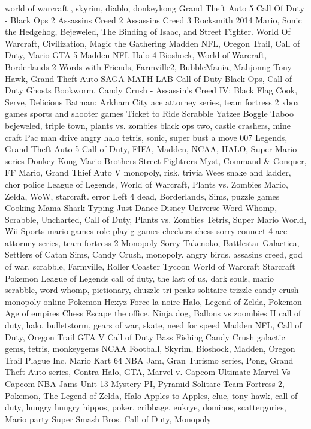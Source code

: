 world of warcraft ,  skyrim,  diablo,  donkeykong
Grand Theft Auto 5  Call Of Duty - Black Ops 2  Assassins Creed 2  Assassins Creed 3  Rocksmith 2014
Mario, Sonic the Hedgehog, Bejeweled, The Binding of Isaac, and Street Fighter.
World Of Warcraft, Civilization, Magic the Gathering
Madden NFL, Oregon Trail, Call of Duty, Mario
GTA 5  Madden NFL  Halo 4  
Bioshock, World of Warcraft, Borderlands 2
Words with Friends, Farmville2, BubbleMania, Mahjonng
Tony Hawk, Grand Theft Auto
SAGA  MATH LAB
Call of Duty Black Ops, Call of Duty Ghosts 
Bookworm, Candy Crush
-
Assassin's Creed IV: Black Flag  Cook, Serve, Delicious  Batman: Arkham City
ace attorney series, team fortress 2
xbox games sports and shooter games
Ticket to Ride  Scrabble  Yatzee  Boggle  Taboo
bejeweled, triple town, plants vs. zombies
black ops two, castle crashers, mine craft
Pac man drive angry halo 
tetris, sonic, super bust a move
007 Legends, Grand Theft Auto 5
Call of Duty, FIFA, Madden, NCAA, HALO, Super Mario series
Donkey Kong   Mario Brothers  Street Fightrers
Myst, Command & Conquer, FF
Mario, Grand Thief Auto V
monopoly, risk, trivia
Wees
snake and ladder, chor police
League of Legends, World of Warcraft, Plants vs. Zombies
Mario, Zelda, WoW, starcraft. 
error
Left 4 dead, Borderlands, Sims, puzzle games
Cooking Mama  Shark Typing  Just Dance  Disney Universe
Word Whomp, Scrabble, Uncharted, Call of Duty, Plants vs. Zombies
Tetris, Super Mario World, Wii Sports
mario games  role playig games  checkers  chess  sorry  connect 4
ace attorney series, team fortress 2
Monopoly  Sorry
Takenoko, Battlestar Galactica, Settlers of Catan
Sims, Candy Crush, monopoly.
angry birds, assasins creed, god of war, scrabble,
Farmville, Roller Coaster Tycoon
World of Warcraft  Starcraft  Pokemon  League of Legends
call of duty, the last of us, dark souls, mario
scrabble, word whomp, pictionary, chuzzle
tri-peaks solitaire  trizzle  candy crush  monopoly online
Pokemon  Hexyz Force
la noire
Halo, Legend of Zelda, Pokemon
Age of empires  Chess
Escape the office, Ninja dog, Ballons vs zoombies II
call of duty, halo, bulletstorm, gears of war, skate, need for speed
Madden NFL, Call of Duty, Oregon Trail
GTA V  Call of Duty  Bass Fishing  Candy Crush  
galactic gems, tetris, monkeygems
NCAA Football, Skyrim, Bioshock, Madden, Oregon Trail
Plague Inc.  Mario Kart 64
NBA Jam, Gran Turismo series, Pong, Grand Theft Auto series, Contra
Halo, GTA, Marvel v. Capcom
Ultimate Marvel Vs Capcom  NBA Jams  Unit 13
Mystery PI, Pyramid Solitare
Team Fortress 2, Pokemon, The Legend of Zelda, Halo
Apples to Apples, clue, tony hawk, call of duty, hungry hungry hippos, poker, cribbage, eukrye, dominos, scattergories, Mario party
Super Smash Bros.
Call of Duty, Monopoly


